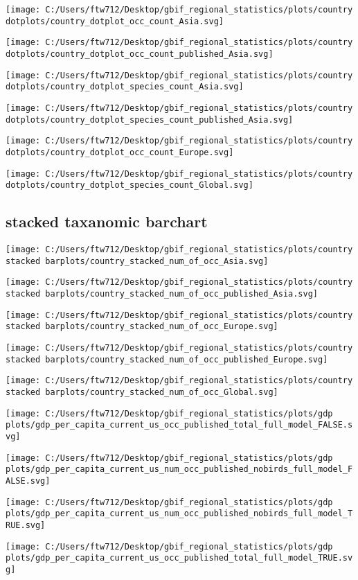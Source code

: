 \documentclass[]{article}
\begin{document}
\texttt{[image: C:/Users/ftw712/Desktop/gbif\_regional\_statistics/plots/country dotplots/country\_dotplot\_occ\_count\_Asia.svg]}

\texttt{[image: C:/Users/ftw712/Desktop/gbif\_regional\_statistics/plots/country dotplots/country\_dotplot\_occ\_count\_published\_Asia.svg]}

\texttt{[image: C:/Users/ftw712/Desktop/gbif\_regional\_statistics/plots/country dotplots/country\_dotplot\_species\_count\_Asia.svg]}

\texttt{[image: C:/Users/ftw712/Desktop/gbif\_regional\_statistics/plots/country dotplots/country\_dotplot\_species\_count\_published\_Asia.svg]}

\texttt{[image: C:/Users/ftw712/Desktop/gbif\_regional\_statistics/plots/country dotplots/country\_dotplot\_occ\_count\_Europe.svg]}

\texttt{[image: C:/Users/ftw712/Desktop/gbif\_regional\_statistics/plots/country dotplots/country\_dotplot\_species\_count\_Global.svg]}

\hypertarget{stacked-taxanomic-barchart}{%
\subsection{stacked taxanomic
barchart}\label{stacked-taxanomic-barchart}}

\texttt{[image: C:/Users/ftw712/Desktop/gbif\_regional\_statistics/plots/country stacked barplots/country\_stacked\_num\_of\_occ\_Asia.svg]}

\texttt{[image: C:/Users/ftw712/Desktop/gbif\_regional\_statistics/plots/country stacked barplots/country\_stacked\_num\_of\_occ\_published\_Asia.svg]}

\texttt{[image: C:/Users/ftw712/Desktop/gbif\_regional\_statistics/plots/country stacked barplots/country\_stacked\_num\_of\_occ\_Europe.svg]}

\texttt{[image: C:/Users/ftw712/Desktop/gbif\_regional\_statistics/plots/country stacked barplots/country\_stacked\_num\_of\_occ\_published\_Europe.svg]}

\texttt{[image: C:/Users/ftw712/Desktop/gbif\_regional\_statistics/plots/country stacked barplots/country\_stacked\_num\_of\_occ\_Global.svg]}

\texttt{[image: C:/Users/ftw712/Desktop/gbif\_regional\_statistics/plots/gdp plots/gdp\_per\_capita\_current\_us\_occ\_published\_total\_full\_model\_FALSE.svg]}

\texttt{[image: C:/Users/ftw712/Desktop/gbif\_regional\_statistics/plots/gdp plots/gdp\_per\_capita\_current\_us\_num\_occ\_published\_nobirds\_full\_model\_FALSE.svg]}

\texttt{[image: C:/Users/ftw712/Desktop/gbif\_regional\_statistics/plots/gdp plots/gdp\_per\_capita\_current\_us\_num\_occ\_published\_nobirds\_full\_model\_TRUE.svg]}

\texttt{[image: C:/Users/ftw712/Desktop/gbif\_regional\_statistics/plots/gdp plots/gdp\_per\_capita\_current\_us\_occ\_published\_total\_full\_model\_TRUE.svg]}
\end{document}

